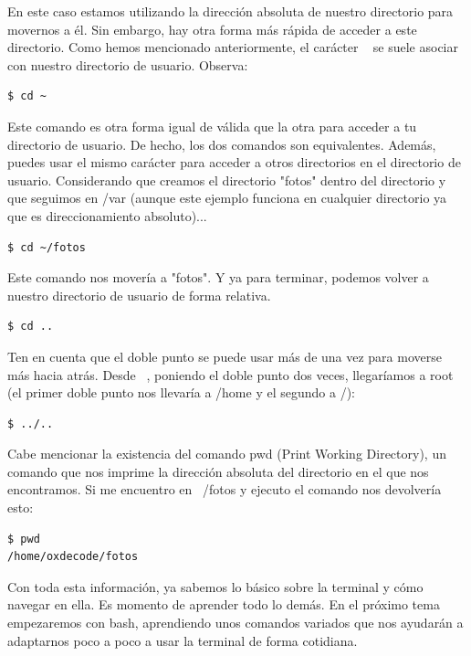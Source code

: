 En este caso estamos utilizando la dirección absoluta de nuestro directorio para movernos a él. Sin embargo, hay otra forma más rápida de acceder a este directorio. Como hemos mencionado anteriormente, el carácter ~ se suele asociar con nuestro directorio de usuario. Observa:

\begin{tcolorbox-code}
\begin{lstlisting}
$ cd ~
\end{lstlisting}
\end{tcolorbox-code}

Este comando es otra forma igual de válida que la otra para acceder a tu directorio de usuario. De hecho, los dos comandos son equivalentes. Además, puedes usar el mismo carácter para acceder a otros directorios en el directorio de usuario. Considerando que creamos el directorio "fotos" dentro del directorio y que seguimos en /var (aunque este ejemplo funciona en cualquier directorio ya que es direccionamiento absoluto)...

\begin{tcolorbox-code}
\begin{lstlisting}
$ cd ~/fotos 
\end{lstlisting}
\end{tcolorbox-code}

Este comando nos movería a "fotos". Y ya para terminar, podemos volver a nuestro directorio de usuario de forma relativa.

\begin{tcolorbox-code}
\begin{lstlisting}
$ cd ..
\end{lstlisting}
\end{tcolorbox-code}

Ten en cuenta que el doble punto se puede usar más de una vez para moverse más hacia atrás. Desde ~, poniendo el doble punto dos veces, llegaríamos a root (el primer doble punto nos llevaría a /home y el segundo a /):

\begin{tcolorbox-code}
\begin{lstlisting}
$ ../..
\end{lstlisting}
\end{tcolorbox-code}

Cabe mencionar la existencia del comando pwd (Print Working Directory), un comando que nos imprime la dirección absoluta del directorio en el que nos encontramos. Si me encuentro en ~/fotos y ejecuto el comando nos devolvería esto:

\begin{tcolorbox-code}
\begin{lstlisting}
$ pwd
/home/oxdecode/fotos
\end{lstlisting}
\end{tcolorbox-code}

Con toda esta información, ya sabemos lo básico sobre la terminal y cómo navegar en ella. Es momento de aprender todo lo demás. En el próximo tema empezaremos con bash, aprendiendo unos comandos variados que nos ayudarán a adaptarnos poco a poco a usar la terminal de forma cotidiana.
